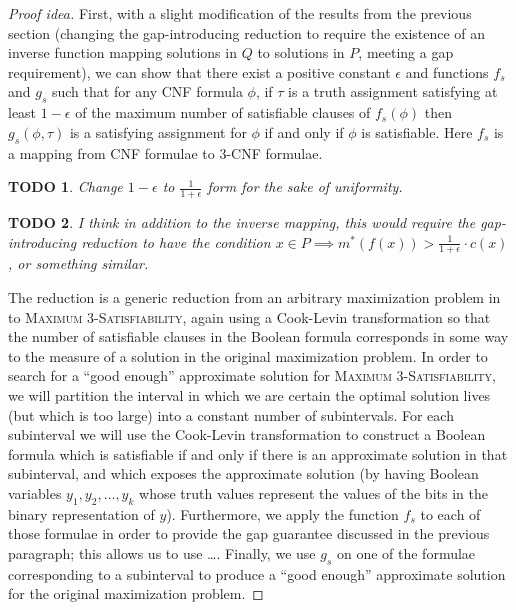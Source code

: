 \documentclass[]{article}
\theoremstyle{plain}
\newtheorem{todo}{TODO}
\theoremstyle{definition}
\newenvironment{proofidea}{\begin{proof}[Proof idea]}{\end{proof}}
\begin{document}
\begin{proofidea}
  First, with a slight modification of the results from the previous section (changing the gap-introducing reduction to require the existence of an inverse function mapping solutions in $Q$ to solutions in $P$, meeting a gap requirement), we can show that there exist a positive constant $\epsilon$ and functions $f_s$ and $g_s$ such that for any CNF formula $\phi$, if $\tau$ is a truth assignment satisfying at least $1 - \epsilon$ of the maximum number of satisfiable clauses of $f_s(\phi)$ then $g_s(\phi, \tau)$ is a satisfying assignment for $\phi$ if and only if $\phi$ is satisfiable.
  Here $f_s$ is a mapping from CNF formulae to 3-CNF formulae.
  \begin{todo}
    Change $1 - \epsilon$ to $\frac{1}{1 + \epsilon}$ form for the sake of uniformity.
  \end{todo}
  \begin{todo}
    I think in addition to the inverse mapping, this would require the gap-introducing reduction to have the condition $x \in P \implies m^*(f(x)) > \frac{1}{1 + \epsilon} \cdot c(x)$, or something similar.
  \end{todo}

  The reduction is a generic reduction from an arbitrary maximization problem in \APX{} to \textsc{Maximum 3-Satisfiability}, again using a Cook-Levin transformation so that the number of satisfiable clauses in the Boolean formula corresponds in some way to the measure of a solution in the original maximization problem.
  In order to search for a ``good enough'' approximate solution for \textsc{Maximum 3-Satisfiability}, we will partition the interval in which we are certain the optimal solution lives (but which is too large) into a constant number of subintervals.
  For each subinterval we will use the Cook-Levin transformation to construct a Boolean formula which is satisfiable if and only if there is an approximate solution in that subinterval, and which exposes the approximate solution (by having Boolean variables $y_1, y_2, \dotsc, y_k$ whose truth values represent the values of the bits in the binary representation of $y$).
  Furthermore, we apply the function $f_s$ to each of those formulae in order to provide the gap guarantee discussed in the previous paragraph; this allows us to use \ldots.
  Finally, we use $g_s$ on one of the formulae corresponding to a subinterval to produce a ``good enough'' approximate solution for the original maximization problem.
\end{proofidea}
\end{document}
